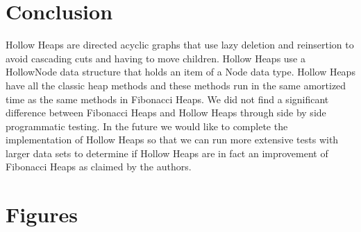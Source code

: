 \documentclass[letter,10pt]{article}
\begin{document}
\section{Conclusion}
\quad Hollow Heaps are directed acyclic graphs that use lazy deletion and reinsertion to avoid cascading cuts and having to move children. Hollow Heaps use a HollowNode data structure that holds an item of a Node data type. Hollow Heaps have all the classic heap methods and these methods run in the same amortized time as the same methods in Fibonacci Heaps. We did not find a significant difference between Fibonacci Heaps and Hollow Heaps through side by side programmatic testing. In the future we would like to complete the implementation of Hollow Heaps so that we can run more extensive tests with larger data sets to determine if Hollow Heaps are in fact an improvement of Fibonacci Heaps as claimed by the authors. 

\section{Figures}
\end{document}
